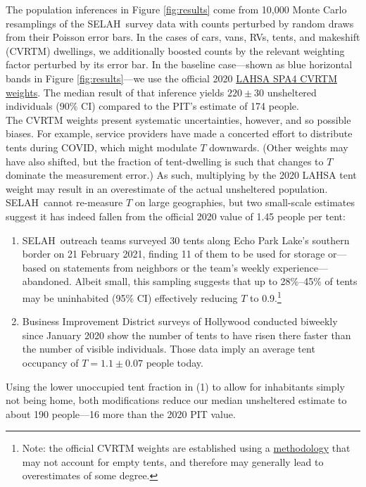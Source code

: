 \documentclass[11pt]{article}
\def\selah{SELAH}
\begin{document}
 The population inferences in Figure \ref{fig:results} come 
from 10,000 Monte Carlo resamplings of the \selah\ survey data with counts perturbed by random 
draws from their Poisson error bars. In the cases of cars, vans, RVs, tents, and makeshift (CVRTM) 
dwellings, we additionally boosted counts by the relevant weighting factor perturbed by its error bar. 
In the baseline case---shown as blue horizontal bands in Figure \ref{fig:results}---we use the official 2020 
\href{https://www.lahsa.org/documents?id=4693-2020-greater-los-angeles-homeless-count-cvrtm-conversion-factors}{LAHSA SPA4 CVRTM weights}. The median result of that inference yields $220\pm30$ unsheltered 
individuals (90\% CI) compared to the PIT's estimate of 174 people.\\
\indent The CVRTM weights present systematic uncertainties, however, and so possible biases. 
For example, service providers have made a concerted effort to distribute tents during COVID, 
which might modulate $T$ downwards. (Other weights may have also shifted, but the fraction of 
tent-dwelling is such that changes to $T$ dominate the measurement error.) As such, multiplying by the 
2020 LAHSA tent weight may result in an overestimate of the actual unsheltered population.\\
\indent \selah\ cannot re-measure $T$ on large geographies, but two small-scale estimates 
suggest it has indeed fallen from the official 2020 value of 1.45 people per tent:
\begin{enumerate}
	\item \selah\ outreach teams surveyed 30 tents along Echo Park Lake's southern border on 21 
	February 2021, finding 11 of them to be used for storage or---based on statements from 
	neighbors or the team's weekly experience---abandoned. Albeit small, this sampling suggests that 
	up to 28\%--45\% of tents may be uninhabited (95\% CI) effectively reducing $T$ to 0.9.\footnote{
	Note: the official CVRTM weights are established using a 
	\href{https://www.lahsa.org/documents?id=4658-usc-2020-homeless-count-methodology-report}{methodology} that may not account for empty tents, and therefore may generally lead to overestimates of
	some degree.}
	\item Business Improvement District surveys of Hollywood conducted biweekly since January 2020 
	show the number of tents to have risen there faster than the number of visible individuals. Those
	data imply an average tent occupancy of $T=1.1\pm0.07$ people today.
\end{enumerate}
\noindent Using the lower unoccupied tent fraction in (1) to allow for inhabitants simply not being home, both 
modifications reduce our median unsheltered estimate to about 190 people---16 more than the 2020 PIT value.
\end{document}
